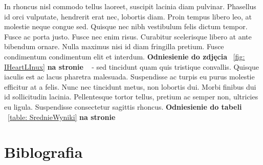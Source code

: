 \documentclass[12pt,a4paper]{article}
\begin{document}
	In rhoncus nisl commodo tellus laoreet, suscipit lacinia diam pulvinar. Phasellus id orci vulputate, hendrerit erat nec, lobortis diam. Proin tempus libero leo, at molestie neque congue sed. Quisque nec nibh vestibulum felis dictum tempor. Fusce ac porta justo. Fusce nec enim risus. Curabitur scelerisque libero at ante bibendum ornare. Nulla maximus nisi id diam fringilla pretium. Fusce condimentum condimentum elit et interdum. \textbf{Odniesienie do zdjęcia} ~\ref{fig: IHeartLInux} \textbf{na stronie} ~\pageref{fig: IHeartLInux} - sed tincidunt quam quis tristique convallis.
	Quisque iaculis est ac lacus pharetra malesuada. Suspendisse ac turpis eu purus molestie efficitur at a felis. Nunc nec tincidunt metus, non lobortis dui. Morbi finibus dui id sollicitudin lacinia. Pellentesque tortor tellus, pretium ac semper non, ultricies eu ligula. Suspendisse consectetur sagittis rhoncus. \textbf{Odniesienie do tabeli} ~\ref{table: SrednieWyniki} \textbf{na stronie} ~\pageref{table: SrednieWyniki}
	
	\newpage
  \section{Biblografia}
  \printbibliography
	
\end{document}
